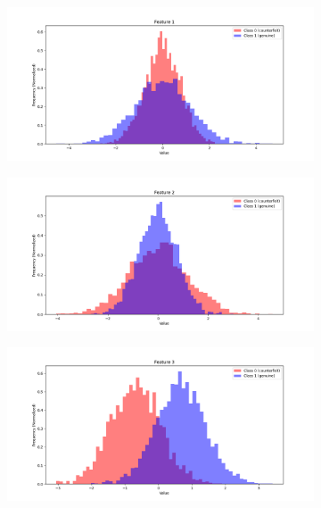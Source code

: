 \documentclass[12pt]{report}
\begin{document}
\begin{figure}[H]
    \centering
    \begin{subfigure}[t]{0.49\textwidth}
        \includegraphics[width=\textwidth]{./plot/features/feature_1.png}
    \end{subfigure}
    \hfill
    \begin{subfigure}[t]{0.49\textwidth}
        \includegraphics[width=\textwidth]{./plot/features/feature_2.png}
    \end{subfigure}
    \begin{subfigure}[t]{0.49\textwidth}
        \includegraphics[width=\textwidth]{./plot/features/feature_3.png}

\end{subfigure}
\end{figure}
\end{document}
